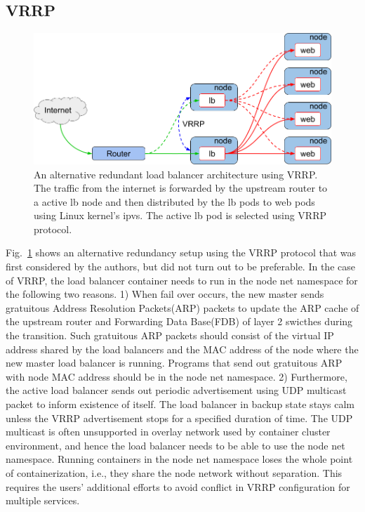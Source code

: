 \subsection{VRRP}\label{Subsec:Redundancy with VRRP}

\begin{figure}[tb]
\centering
\includegraphics[width=0.8\columnwidth]{Figs/vrrp.png}
\caption{
  An alternative redundant load balancer architecture using VRRP. \\ %
  The traffic from the internet is forwarded by the upstream router to a active lb node and then distributed by the lb pods to web pods using Linux kernel's ipvs.
  The active lb pod is selected using VRRP protocol.
}
\label{fig:vrrp}
\end{figure}

Fig.~\ref{fig:vrrp} shows an alternative redundancy setup using the VRRP protocol that was first considered by the authors, but did not turn out to be preferable.
In the case of VRRP, the load balancer container needs to run in the node net namespace for the following two reasons.
1) When fail over occurs, the new master sends gratuitous Address Resolution Packets(ARP) packets to update the ARP cache of the upstream router and Forwarding Data Base(FDB) of layer 2 swicthes during the transition.
Such gratuitous ARP packets should consist of the virtual IP address shared by the load balancers and the MAC address of the node where the new master load balancer is running.
Programs that send out gratuitous ARP with node MAC address should be in the node net namespace.
%
2) Furthermore, the active load balancer sends out periodic advertisement using UDP multicast packet to inform existence of itself.
The load balancer in backup state stays calm unless the VRRP advertisement stops for a specified duration of time.
The UDP multicast is often unsupported in overlay network used by container cluster environment, and hence the load balancer needs to be able to use the node net namespace.
%
Running containers in the node net namespace loses the whole point of containerization, i.e., they share the node network without separation.
This requires the users' additional efforts to avoid conflict in VRRP configuration for multiple services.
%

